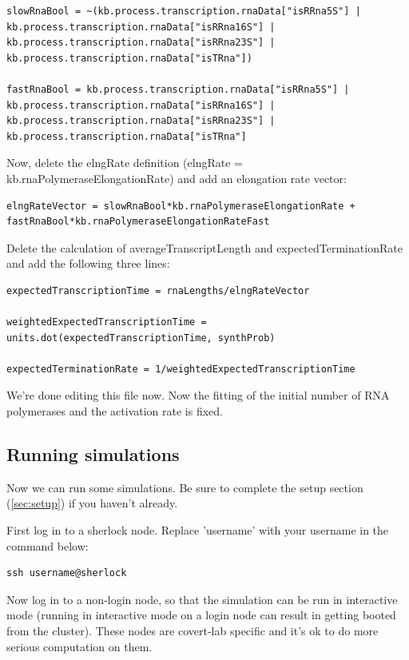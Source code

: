 \documentclass[12pt]{article}
\begin{document}
\begin{lstlisting}
slowRnaBool = ~(kb.process.transcription.rnaData["isRRna5S"] | kb.process.transcription.rnaData["isRRna16S"] | kb.process.transcription.rnaData["isRRna23S"] | kb.process.transcription.rnaData["isTRna"])

fastRnaBool = kb.process.transcription.rnaData["isRRna5S"] | kb.process.transcription.rnaData["isRRna16S"] | kb.process.transcription.rnaData["isRRna23S"] | kb.process.transcription.rnaData["isTRna"]
\end{lstlisting}

Now, delete the elngRate definition (elngRate = kb.rnaPolymeraseElongationRate) and add an elongation rate vector:

\begin{lstlisting}
elngRateVector = slowRnaBool*kb.rnaPolymeraseElongationRate + fastRnaBool*kb.rnaPolymeraseElongationRateFast
\end{lstlisting}

Delete the calculation of averageTranscriptLength and expectedTerminationRate and add the following three lines:

\begin{lstlisting}
expectedTranscriptionTime = rnaLengths/elngRateVector

weightedExpectedTranscriptionTime = units.dot(expectedTranscriptionTime, synthProb)

expectedTerminationRate = 1/weightedExpectedTranscriptionTime
\end{lstlisting}

We’re done editing this file now. Now the fitting of the initial number of RNA polymerases and the activation rate is fixed. 




\subsection{Running simulations}

Now we can run some simulations. Be sure to complete the setup section (\ref{sec:setup}) if you haven't already.
\par
First log in to a sherlock node. Replace 'username' with your username in the command below:

\lstset{language=bash}
\begin{lstlisting}
ssh username@sherlock
\end{lstlisting}

Now log in to a non-login node, so that the simulation can be run in interactive mode (running in interactive mode on a login node can result in getting booted from the cluster). These nodes are covert-lab specific and it's ok to do more serious computation on them.
\end{document}
